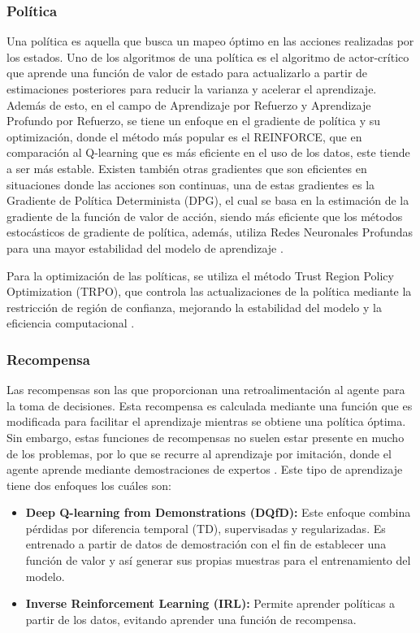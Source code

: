 \subsubsection{Política}

Una política es aquella que busca un mapeo óptimo en las acciones realizadas por los estados. Uno de los algoritmos de una política es el algoritmo de actor-crítico que aprende una función de valor de estado para actualizarlo a partir de estimaciones posteriores para reducir la varianza y acelerar el aprendizaje. Además de esto, en el campo de Aprendizaje por Refuerzo y Aprendizaje Profundo por Refuerzo, se tiene un enfoque en el gradiente de política y su optimización, donde el método más popular es el REINFORCE, que en comparación al Q-learning que es más eficiente en el uso de los datos, este tiende a ser más estable. Existen también otras gradientes que son eficientes en situaciones donde las acciones son continuas, una de estas gradientes es la Gradiente de Política Determinista (DPG), el cual se basa en la estimación de la gradiente de la función de valor de acción, siendo más eficiente que los métodos estocásticos de gradiente de política, además, utiliza Redes Neuronales Profundas para una mayor estabilidad del modelo de aprendizaje \parencite{pr_artiDeep}.

Para la optimización de las políticas, se utiliza el método Trust Region Policy Optimization (TRPO), que controla las actualizaciones de la política mediante la restricción de región de confianza, mejorando la estabilidad del modelo y la eficiencia computacional \parencite{pr_artiDeep}. 

\subsubsection{Recompensa}
Las recompensas son las que proporcionan una retroalimentación al agente para la toma de decisiones. Esta recompensa es calculada mediante una función que es modificada para facilitar el aprendizaje mientras se obtiene una política óptima. Sin embargo, estas funciones de recompensas no suelen estar presente en mucho de los problemas, por lo que se recurre al aprendizaje por imitación, donde el agente aprende mediante demostraciones de expertos \parencite{pr_artiDeep}. Este tipo de aprendizaje tiene dos enfoques los cuáles son:

\begin{itemize}
	\item \textbf{Deep Q-learning from Demonstrations (DQfD):} Este enfoque combina pérdidas por diferencia temporal (TD), supervisadas y regularizadas. Es entrenado a partir de datos de demostración con el fin de establecer una función de valor y así generar sus propias muestras para el entrenamiento del modelo.
	\item \textbf{Inverse Reinforcement Learning (IRL):} Permite aprender políticas a partir de los datos, evitando aprender una función de recompensa.
\end{itemize}

